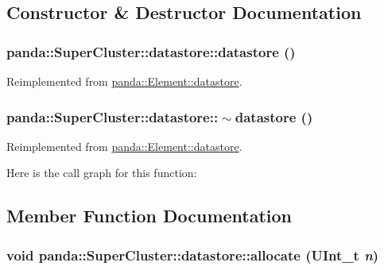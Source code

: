 \subsection{Constructor \& Destructor Documentation}
\hypertarget{structpanda_1_1SuperCluster_1_1datastore_a6c05d06e725e0b236f93d8f62bb4f6eb}{
\subsubsection[{datastore}]{\setlength{\rightskip}{0pt plus 5cm}panda::SuperCluster::datastore::datastore ()}}
\label{structpanda_1_1SuperCluster_1_1datastore_a6c05d06e725e0b236f93d8f62bb4f6eb}


Reimplemented from \hyperlink{structpanda_1_1Element_1_1datastore_a19506caec8d63f38674506dbb8283495}{panda::Element::datastore}.\hypertarget{structpanda_1_1SuperCluster_1_1datastore_ad47081958ab7831bd7d6656e0655bbfd}{
\subsubsection[{$\sim$datastore}]{\setlength{\rightskip}{0pt plus 5cm}panda::SuperCluster::datastore::$\sim$datastore ()}}
\label{structpanda_1_1SuperCluster_1_1datastore_ad47081958ab7831bd7d6656e0655bbfd}


Reimplemented from \hyperlink{structpanda_1_1Element_1_1datastore_a14bdbf5fcb0c5553c70d43de0cffd090}{panda::Element::datastore}.

Here is the call graph for this function:

\subsection{Member Function Documentation}
\hypertarget{structpanda_1_1SuperCluster_1_1datastore_a24b328c94059debffe88149d5d4e8367}{
\subsubsection[{allocate}]{\setlength{\rightskip}{0pt plus 5cm}void panda::SuperCluster::datastore::allocate (UInt\_\-t {\em n})}}
\label{structpanda_1_1SuperCluster_1_1datastore_a24b328c94059debffe88149d5d4e8367}


